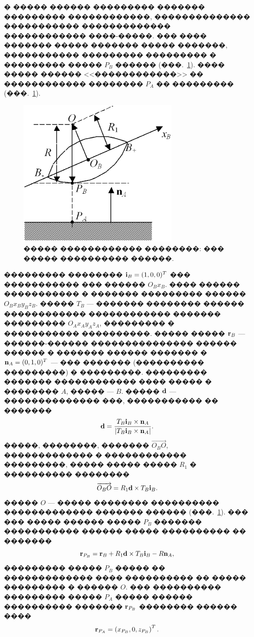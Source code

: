 \documentclass[12pt,a4paper]{article}
\begin{document}
� ����� ������ ��������� ������� ��������� ������������, �������������� 
����������� ������������� ������������ ����-�����. ��� ���� ������� �����
������� ����� �������, ����������� ��������� ��������� � ��������� ����� $P_B$
������ (���.~\ref{ContactScheme}). ���� ����� ������ <<������������>> �� 
������������ �������� $P_A$ �� ��������� (���.~\ref{ContactScheme}).
\begin{figure}[htb]
\centering\includegraphics[width=8cm]{RollerSection.eps}
\caption{����� ������������ ��������: ��� ����� ���������� ������.}
\label{ContactScheme}
\end{figure}

��������� �������� ${\bf i}_B=(1,0,0)^T$ ��� ����������� ��� ������ $O_Bx_B$.
���� ������ ����������� � ������� ��������� ������ $O_Bx_By_Bz_B$. ����� $T_B$
--- ������� �������� ������ ������������ ������������ ������� ��������� 
$O_Ax_Ay_Az_A$, ��������� � ����������� ����������. ����� ����� ${\bf r}_B$ ---
������-������ ��������������� ������ ������ � ������� ������ ������� � 
${\bf n}_A=(0,1,0)^T$ --- ��� ������� (���������� ���������) � ���������. 
��������� ������� ������������ ���� ����� � �������� $A$, ����� --- $B$. �����
${\bf d}$ --- �������������� ���, ����������� �� �������
$$
{\bf d}=\dfrac{T_B{\bf i}_B\times {\bf n}_A}
              {\left| T_B{\bf i}_B\times {\bf n}_A\right|}.
$$
�����, ��������, ������� $\overrightarrow{O_BO}$, ������������� � ������������
���������, ����� ����� ����� $R_1$ � ���������� ��������
$$
\overrightarrow{O_BO}=R_1{\bf d}\times T_B{\bf i}_B.
$$
����� $O$ --- ����� �������� ���������� ������������� ������� ������ 
(���.~\ref{ContactScheme}). ��� ��� ����� ������ ����� $P_B$ ������� 
����������� ������ ����� ���������� �� �������
\begin{equation}
{\bf r}_{P_B}={\bf r}_B+R_1{\bf d}\times T_B{\bf i}_B-R{\bf n}_A,
\label{3_2_0}
\end{equation}
��������� ����� $P_B$ ����� �� ������������� ���� ���������� �� ����� ��������� 
� ������ $O$. ��� ���������� ��������� ����� $P_A$ ����� ������ ���������� 
������� ${\bf r}_{P_B}$ �������� ������ ����
\begin{equation}
{\bf r}_{P_A}=\left( x_{P_B},0,z_{P_B}\right) ^T.
\label{3_2_1}
\end{equation}
\end{document}

